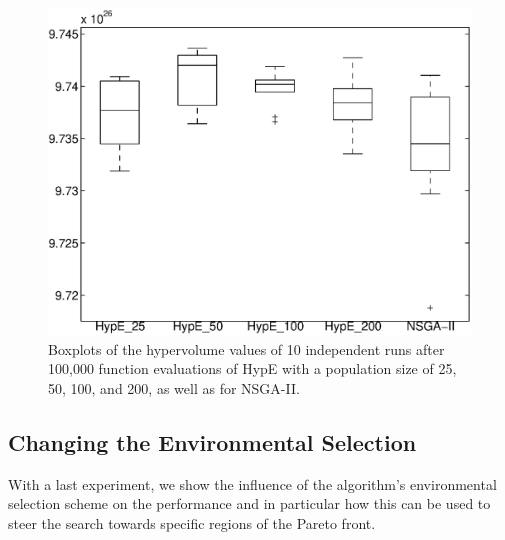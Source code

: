 \documentclass[preprint,12pt]{elsarticle}
\begin{document}
\begin{figure}%
	\centering
	\includegraphics[width=0.5\columnwidth]{../experiments/randVsCost/hypervolumes/algoComparison}%
	\caption{\label{fig:algoComparison} Boxplots of the hypervolume values of 10 independent runs after 100,000 function evaluations of HypE with a population size of 25, 50, 100, and 200, as well as for NSGA-II.}
\end{figure}

\subsection{Changing the Environmental Selection}
With a last experiment, we show the influence of the algorithm's environmental selection scheme on the performance and in particular how this can be used to steer the search towards specific regions of the Pareto front.
\end{document}
